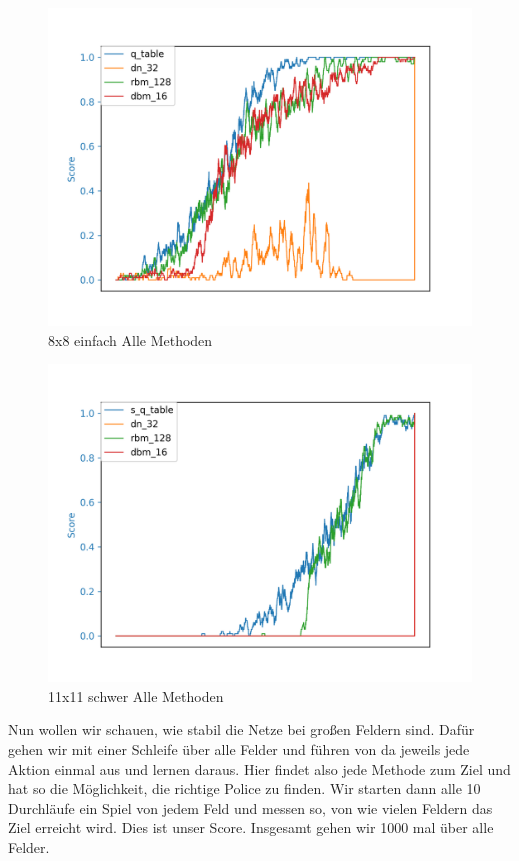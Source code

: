 \begin{figure}[H]
\centering
\includegraphics[width=\textwidth]{Figures/all_8x8_q_table_dn_32_rbm_128_dbm_16.png}
\caption{8x8 einfach Alle Methoden}
\label{all_13}
\end{figure}

\begin{figure}[H]
\centering
\includegraphics[width=\textwidth]{Figures/all_8x8_s_q_table_dn_32_rbm_128_dbm_16.png}
\caption{11x11 schwer Alle Methoden}
\label{all_14}
\end{figure}

Nun wollen wir schauen, wie stabil die Netze bei großen Feldern sind. Dafür gehen wir mit einer Schleife über alle Felder und führen von da jeweils jede Aktion einmal aus und lernen daraus. Hier findet also jede Methode zum Ziel und hat so die Möglichkeit, die richtige Police zu finden. Wir starten dann alle 10 Durchläufe ein Spiel von jedem Feld und messen so, von wie vielen Feldern das Ziel erreicht wird. Dies ist unser Score. Insgesamt gehen wir 1000 mal über alle Felder.

